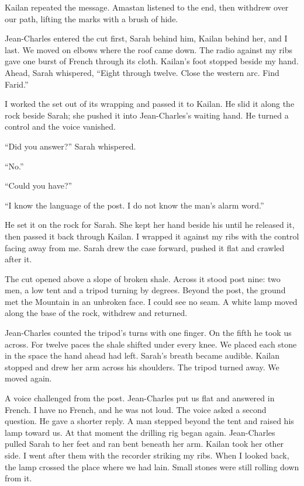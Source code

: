 Kailan repeated the message. Amastan listened to the end, then withdrew over our path, lifting the marks with a brush of hide.\par

Jean-Charles entered the cut first, Sarah behind him, Kailan behind her, and I last. We moved on elbows where the roof came down. The radio against my ribs gave one burst of French through its cloth. Kailan's foot stopped beside my hand. Ahead, Sarah whispered, ``Eight through twelve. Close the western arc. Find Farid.''\par

I worked the set out of its wrapping and passed it to Kailan. He slid it along the rock beside Sarah; she pushed it into Jean-Charles's waiting hand. He turned a control and the voice vanished.\par

``Did you answer?'' Sarah whispered.\par

``No.''\par

``Could you have?''\par

``I know the language of the post. I do not know the man's alarm word.''\par

He set it on the rock for Sarah. She kept her hand beside his until he released it, then passed it back through Kailan. I wrapped it against my ribs with the control facing away from me. Sarah drew the case forward, pushed it flat and crawled after it.\par

The cut opened above a slope of broken shale. Across it stood post nine: two men, a low tent and a tripod turning by degrees. Beyond the post, the ground met the Mountain in an unbroken face. I could see no seam. A white lamp moved along the base of the rock, withdrew and returned.\par

Jean-Charles counted the tripod's turns with one finger. On the fifth he took us across. For twelve paces the shale shifted under every knee. We placed each stone in the space the hand ahead had left. Sarah's breath became audible. Kailan stopped and drew her arm across his shoulders. The tripod turned away. We moved again.\par

A voice challenged from the post. Jean-Charles put us flat and answered in French. I have no French, and he was not loud. The voice asked a second question. He gave a shorter reply. A man stepped beyond the tent and raised his lamp toward us. At that moment the drilling rig began again. Jean-Charles pulled Sarah to her feet and ran bent beneath her arm. Kailan took her other side. I went after them with the recorder striking my ribs. When I looked back, the lamp crossed the place where we had lain. Small stones were still rolling down from it.\par

